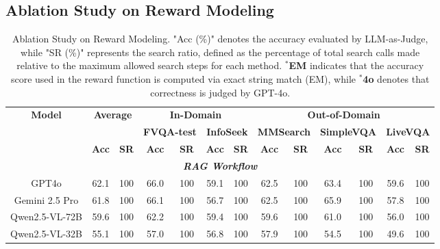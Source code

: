 \documentclass{article}
\begin{document}
\subsection{Ablation Study on Reward Modeling}
\label{appendix:abl-4o-reward}

\begin{table}[t]
\footnotesize
\centering
\caption{Ablation Study on Reward Modeling. 
"Acc (\%)" denotes the accuracy evaluated by LLM-as-Judge, while "SR (\%)" represents the search ratio, defined as the percentage of total search calls made relative to the maximum allowed search steps for each method. \textbf{$^*$EM} indicates that the accuracy score used in the reward function is computed via exact string match (EM), while \textbf{$^*$4o} denotes that correctness is judged by GPT-4o.}
\label{tab:4o-reward}
\setlength{\tabcolsep}{5pt}
\begin{tabular}{ccccccccccccc}
\toprule
\multicolumn{1}{c|}{\multirow{3}{*}{\textbf{Model}}} & \multicolumn{2}{c|}{\multirow{2}{*}{\textbf{Average}}} & \multicolumn{4}{c|}{\textbf{In-Domain}} & \multicolumn{6}{c}{\textbf{Out-of-Domain}} \\
\multicolumn{1}{c|}{} & \multicolumn{2}{c|}{} & \multicolumn{2}{c}{\textbf{FVQA-test}} & \multicolumn{2}{c|}{\textbf{InfoSeek}} & \multicolumn{2}{c}{\textbf{MMSearch}} & \multicolumn{2}{c}{\textbf{SimpleVQA}} & \multicolumn{2}{l}{\textbf{LiveVQA}} \\
\multicolumn{1}{c|}{} & \textbf{Acc} & \multicolumn{1}{c|}{\textbf{SR}} & \textbf{Acc} & \textbf{SR} & \textbf{Acc} & \multicolumn{1}{c|}{\textbf{SR}} & \textbf{Acc} & \textbf{SR} & \textbf{Acc} & \textbf{SR} & \multicolumn{1}{c}{\textbf{Acc}} & \multicolumn{1}{c}{\textbf{SR}} \\ \midrule
\multicolumn{13}{c}{\textit{\textbf{RAG Workflow}}} \\ \midrule
\multicolumn{1}{c|}{GPT4o} & 62.1 & \multicolumn{1}{c|}{100} & 66.0 & 100 & 59.1 & \multicolumn{1}{c|}{100} & 62.5 & 100 & 63.4 & 100 & 59.6 & 100 \\
\multicolumn{1}{c|}{Gemini 2.5 Pro} & 61.8 & \multicolumn{1}{c|}{100} & 66.1 & 100 & 56.7 & \multicolumn{1}{c|}{100} & 62.5 & 100 & 65.9 & 100 & 57.8 & 100 \\
\multicolumn{1}{c|}{Qwen2.5-VL-72B} & 59.6 & \multicolumn{1}{c|}{100} & 62.2 & 100 & 59.4 & \multicolumn{1}{c|}{100} & 59.6 & 100 & 61.0 & 100 & 56.0 & 100 \\
\multicolumn{1}{c|}{Qwen2.5-VL-32B} & 55.1 & \multicolumn{1}{c|}{100} & 57.0 & 100 & 56.8 & \multicolumn{1}{c|}{100} & 57.9 & 100 & 54.5 & 100 & 49.6 & 100 \\

\end{tabular}
\end{table}
\end{document}
